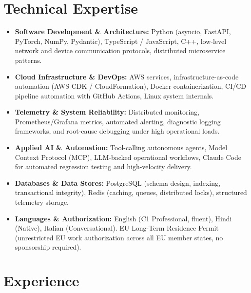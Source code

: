 \documentclass[10pt,a4paper]{article}
\begin{document}
\section{Technical Expertise}
\begin{itemize}
  \item \textbf{Software Development \& Architecture:} Python (asyncio, FastAPI, PyTorch, NumPy, Pydantic), TypeScript / JavaScript, C++, low-level network and device communication protocols, distributed microservice patterns.
  \item \textbf{Cloud Infrastructure \& DevOps:} AWS services, infrastructure-as-code automation (AWS CDK / CloudFormation), Docker containerization, CI/CD pipeline automation with GitHub Actions, Linux system internals.
  \item \textbf{Telemetry \& System Reliability:} Distributed monitoring, Prometheus/Grafana metrics, automated alerting, diagnostic logging frameworks, and root-cause debugging under high operational loads.
  \item \textbf{Applied AI \& Automation:} Tool-calling autonomous agents, Model Context Protocol (MCP), LLM-backed operational workflows, Claude Code for automated regression testing and high-velocity delivery.
  \item \textbf{Databases \& Data Stores:} PostgreSQL (schema design, indexing, transactional integrity), Redis (caching, queues, distributed locks), structured telemetry storage.
  \item \textbf{Languages \& Authorization:} English (C1 Professional, fluent), Hindi (Native), Italian (Conversational). EU Long-Term Residence Permit (unrestricted EU work authorization across all EU member states, no sponsorship required).
\end{itemize}

\section{Experience}
\end{document}
